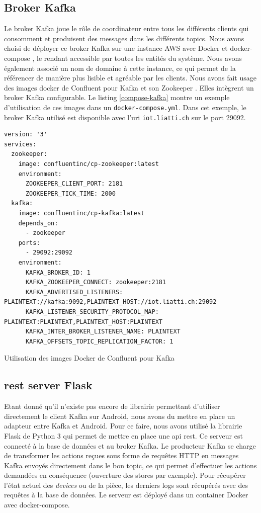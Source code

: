 \subsection{Broker Kafka}
Le broker Kafka joue le rôle de coordinateur entre tous les différents clients qui consomment et produisent des messages dans les différents topics. Nous avons choisi de déployer ce broker Kafka sur une instance AWS \cite{aws} avec Docker \cite{docker} et docker-compose \cite{docker-compose}, le rendant accessible par toutes les entités du système.
Nous avons également associé un nom de domaine à cette instance, ce qui permet de la référencer de manière plus lisible et agréable par les clients. Nous avons fait usage des images docker de Confluent \cite{confluent} pour Kafka \cite{cp-kafka} et son Zookeeper \cite{cp-zookeeper}. Elles intègrent un broker Kafka configurable. Le listing \ref{compose-kafka} montre un exemple d'utilisation de ces images dans un \texttt{docker-compose.yml}. Dans cet exemple, le broker Kafka utilisé est disponible avec l'\acrshort{uri} \texttt{iot.liatti.ch} sur le port 29092.
\begin{code}
    \begin{verbatim}
version: '3'
services:
  zookeeper:
    image: confluentinc/cp-zookeeper:latest
    environment:
      ZOOKEEPER_CLIENT_PORT: 2181
      ZOOKEEPER_TICK_TIME: 2000
  kafka:
    image: confluentinc/cp-kafka:latest
    depends_on:
      - zookeeper
    ports:
      - 29092:29092
    environment:
      KAFKA_BROKER_ID: 1
      KAFKA_ZOOKEEPER_CONNECT: zookeeper:2181
      KAFKA_ADVERTISED_LISTENERS: PLAINTEXT://kafka:9092,PLAINTEXT_HOST://iot.liatti.ch:29092
      KAFKA_LISTENER_SECURITY_PROTOCOL_MAP: PLAINTEXT:PLAINTEXT,PLAINTEXT_HOST:PLAINTEXT
      KAFKA_INTER_BROKER_LISTENER_NAME: PLAINTEXT
      KAFKA_OFFSETS_TOPIC_REPLICATION_FACTOR: 1
    \end{verbatim}
    \caption{Utilisation des images Docker de Confluent pour Kafka}
    \label{compose-kafka}
\end{code}

\subsection{\acrshort{rest} server Flask}
Etant donné qu'il n'existe pas encore de librairie permettant d'utiliser directement le client Kafka sur Android, nous avons du mettre en place un adapteur entre Kafka et Android.
Pour ce faire, nous avons utilisé la librairie Flask \cite{flask} de Python 3 qui permet de mettre en place une \acrshort{api} \acrshort{rest}. Ce serveur est connecté à la base de données et au broker Kafka. Le producteur Kafka se charge de transformer les actions reçues sous forme de requêtes HTTP en messages Kafka envoyés directement dans le bon topic, ce qui permet d'effectuer les actions demandées en conséquence (ouverture des stores par exemple). Pour récupérer l'état actuel des \textit{devices} ou de la pièce, les derniers logs sont récupérés avec des requêtes à la base de données. Le serveur est déployé dans un container Docker avec docker-compose.

